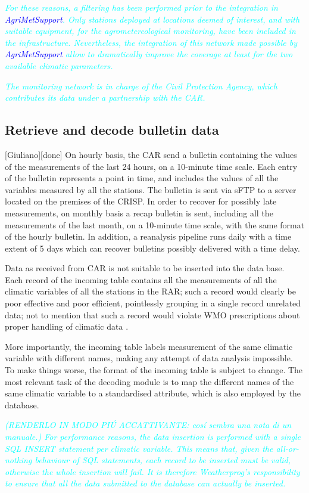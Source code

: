 \documentclass[authoryear,preprint,review,12pt]{elsarticle}
\newcommand{\update}[1]{\emph{\textcolor{blue}{#1}}}
\newcommand{\review}[1]{\emph{\textcolor{cyan}{#1}}}
\newcommand{\gci}{\update{AgriMetSupport}\xspace}
\begin{document}
\review{For these reasons, a filtering has been performed prior to the integration in \gci. Only stations deployed at locations deemed of interest, and with suitable equipment, for the agrometereological monitoring, have been included in the infrastructure. Nevertheless, the integration of this network made possible by \gci allow to dramatically improve the coverage at least for the two available climatic parameters.}

\review{ The monitoring network is in charge of the Civil Protection Agency, which contributes its data under a partnership with the CAR.}

\subsection{Retrieve and decode bulletin data}[Giuliano][done]
On hourly basis, the CAR send a bulletin containing the values of the measurements of the last 24 hours, on a 10-minute time scale. Each entry of the bulletin represents a point in time, and includes the values of all the variables measured by all the stations. The bulletin is sent via sFTP to a server located on the premises of the CRISP.
In order to recover for possibly late measurements, on monthly basis a recap bulletin is sent, including all the measurements of the last month, on a 10-minute time scale, with the same format of the hourly bulletin.
In addition, a reanalysis pipeline runs daily with a time extent of 5 days which can recover bulletins possibly delivered with a time delay.

Data as received from CAR is not suitable to be inserted into the data base. Each record of the incoming table contains all the measurements of all the climatic variables of all the stations in the RAR; such a record would clearly be poor effective and poor efficient, pointlessly grouping in a single record unrelated data; not to mention that such a record would violate WMO prescriptions about proper handling of climatic data \citep{wcdmp:cdms}.
 
 More importantly, the incoming table labels measurement of the same climatic variable with different names, making any attempt of data analysis impossible. To make things worse, the format of the incoming table is subject to change. The most relevant task of the decoding module is to map the different names of the same climatic variable to a standardised attribute, which is also employed by the database.

 \review{(RENDERLO IN MODO PI\'U ACCATTIVANTE: cos\'i sembra una nota di un manuale.) For performance reasons, the data insertion is performed with a single SQL INSERT statement per climatic variable. This means that, given the all-or-nothing behaviour of SQL statements, each record to be inserted must be valid, otherwise the whole insertion will fail. It is therefore Weatherprog's responsibility to ensure that all the data submitted to the database can actually be inserted.}
 
\end{document}

